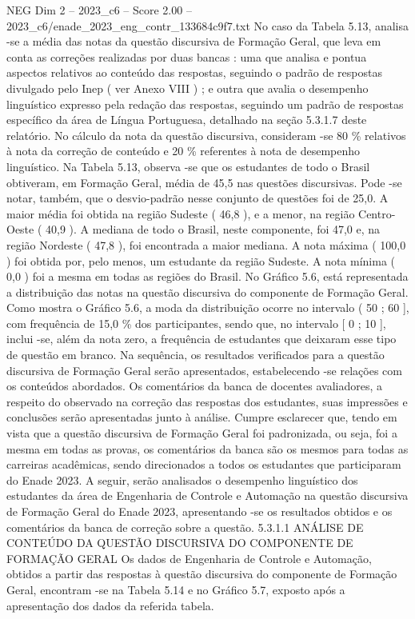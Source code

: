 \begin{textsample}{NEG Dim 2 – 2023\_c6 – Score 2.00 – 2023\_c6/enade\_2023\_eng\_contr\_133684c9f7.txt}
No caso da Tabela 5.13, analisa -se a média das notas da questão discursiva de Formação Geral, que leva em conta as correções realizadas por duas bancas : uma que analisa e pontua aspectos relativos ao conteúdo das respostas, seguindo o padrão de respostas divulgado pelo Inep ( ver Anexo VIII ) ; e outra que avalia o desempenho linguístico expresso pela redação das respostas, seguindo um padrão de respostas específico da área de Língua Portuguesa, detalhado na seção 5.3.1.7 deste relatório.
No cálculo da nota da questão discursiva, consideram -se 80 \% relativos à nota da correção de conteúdo e 20 \% referentes à nota de desempenho linguístico.
Na Tabela 5.13, observa -se que os estudantes de todo o Brasil obtiveram, em Formação Geral, média de 45,5 nas questões discursivas.
Pode -se notar, também, que o desvio-padrão nesse conjunto de questões foi de 25,0.
A maior média foi obtida na região Sudeste ( 46,8 ), e a menor, na região Centro-Oeste ( 40,9 ).
A mediana de todo o Brasil, neste componente, foi 47,0 e, na região Nordeste ( 47,8 ), foi encontrada a maior mediana.
A nota máxima ( 100,0 ) foi obtida por, pelo menos, um estudante da região Sudeste.
A nota mínima ( 0,0 ) foi a mesma em todas as regiões do Brasil.
No Gráfico 5.6, está representada a distribuição das notas na questão discursiva do componente de Formação Geral.
Como mostra o Gráfico 5.6, a moda da distribuição ocorre no intervalo ( 50 ; 60 ], com frequência de 15,0 \% dos participantes, sendo que, no intervalo [ 0 ; 10 ], inclui -se, além da nota zero, a frequência de estudantes que deixaram esse tipo de questão em branco.
Na sequência, os resultados verificados para a questão discursiva de Formação Geral serão apresentados, estabelecendo -se relações com os conteúdos abordados.
Os comentários da banca de docentes avaliadores, a respeito do observado na correção das respostas dos estudantes, suas impressões e conclusões serão apresentadas junto à análise.
Cumpre esclarecer que, tendo em vista que a questão discursiva de Formação Geral foi padronizada, ou seja, foi a mesma em todas as provas, os comentários da banca são os mesmos para todas as carreiras acadêmicas, sendo direcionados a todos os estudantes que participaram do Enade 2023.
A seguir, serão analisados o desempenho linguístico dos estudantes da área de Engenharia de Controle e Automação na questão discursiva de Formação Geral do Enade 2023, apresentando -se os resultados obtidos e os comentários da banca de correção sobre a questão. 5.3.1.1 ANÁLISE DE CONTEÚDO DA QUESTÃO DISCURSIVA DO COMPONENTE DE FORMAÇÃO GERAL Os dados de Engenharia de Controle e Automação, obtidos a partir das respostas à questão discursiva do componente de Formação Geral, encontram -se na Tabela 5.14 e no Gráfico 5.7, exposto após a apresentação dos dados da referida tabela.

\end{textsample}
